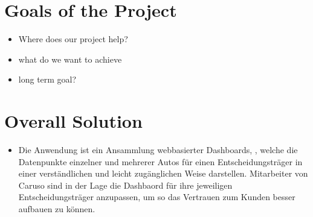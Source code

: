 \section{Goals of the Project}
\begin{itemize}
  \item Where does our project help?
  \item what do we want to achieve
  \item long term goal?
\end{itemize}

\section{Overall Solution}
\begin{itemize}
  \item Die Anwendung ist ein Ansammlung webbasierter Dashboards, , welche die Datenpunkte einzelner und mehrerer Autos für einen Entscheidungsträger in einer verständlichen und leicht zugänglichen Weise darstellen. Mitarbeiter von Caruso sind in der Lage die Dashbaord für ihre jeweiligen Entscheidungsträger anzupassen, um so das Vertrauen zum Kunden besser aufbauen zu können.
\end{itemize}
